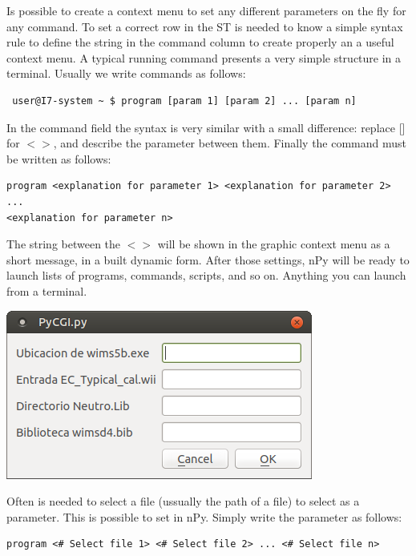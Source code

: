 \documentclass[a4paper,10pt]{article}
\begin{document}
Is possible to create a context menu to set any different parameters on the fly for any command. To set a correct row in the ST is needed to know a simple syntax rule to define the string in the command column to create properly an a useful context menu. A typical running command presents a very simple structure in a terminal. Usually we write commands as follows:

\begin{verbatim}
 user@I7-system ~ $ program [param 1] [param 2] ... [param n]
\end{verbatim}

In the command field the syntax is very similar with a small difference: replace [] for $< >$, and describe the parameter between them. Finally the command must be written as follows:

\begin{verbatim}
program <explanation for parameter 1> <explanation for parameter 2> ... 
<explanation for parameter n>
 \end{verbatim}

The string between the $< >$ will be shown in the graphic context menu as a short message, in a built dynamic form. After those settings, nPy will be ready to launch lists of programs, commands, scripts, and so on. Anything you can launch from a terminal.

\begin{center}
 \includegraphics[width=\textwidth]{img/contextMenuString.png}
\end{center}

Often is needed to select a file (ussually the path of a file) to select as a parameter. This is possible to set in nPy. Simply write the parameter as follows: 

\begin{verbatim}
program <# Select file 1> <# Select file 2> ... <# Select file n>
 \end{verbatim}
\end{document}
